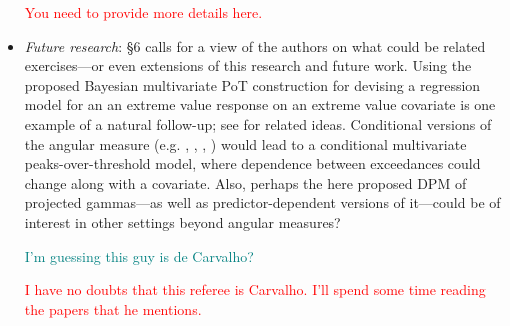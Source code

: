 \documentclass[10pt]{article}
\newcommand{\comment}[1]{\textcolor{teal}{#1}}
\newcommand{\bruno}[1]{\textcolor{red}{#1}}
\begin{document}
\begin{itemize}
    \bruno{You need to provide more details here.}

\item \emph{Future research}: §6 calls for a view of the authors on what 
    could be related exercises—or even extensions of this research and future 
    work. Using the proposed Bayesian multivariate PoT construction for 
    devising a regression model for an an extreme value response on an extreme 
    value covariate is one example of a natural follow-up; see 
    \cite{carvalho2022} for related ideas. Conditional versions of the angular 
    measure (e.g. \cite{carvalho2016}, \cite{castro2018}, \cite{escobar2018}, 
    \cite{mhalla2019}) would lead to a conditional multivariate 
    peaks-over-threshold model, where dependence between exceedances could 
    change along with a covariate. Also, perhaps the here proposed DPM of 
    projected gammas—as well as predictor-dependent versions of it—could be of 
    interest in other settings beyond angular measures?

    \comment{I'm guessing this guy is de Carvalho?}
    
    \bruno{I have no doubts that this referee is Carvalho. I'll spend some time 
    reading the papers that he mentions.}
    
\end{itemize}
\end{document}
